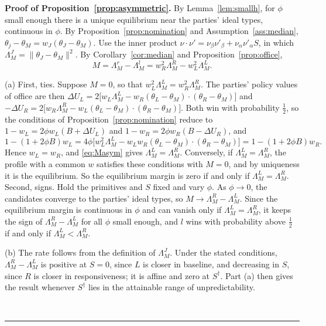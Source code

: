 \documentclass[12pt,letterpaper]{article}
\newenvironment{proof}[1][Proof]{\noindent\textbf{#1.} }{\ \rule{0.5em}{0.5em}}
\begin{document}
\begin{proof}[Proof of Proposition~\ref{prop:asymmetric}]
By Lemma~\ref{lem:smallh}, for $\phi$ small enough there is a unique equilibrium near the parties' ideal types, continuous in $\phi$. By Proposition~\ref{prop:nomination} and Assumption~\ref{ass:median}, $\theta_j-\theta_M=w_J(\theta_J-\theta_M)$. Use the inner product $\nu\cdot\nu'=\nu_\beta\nu'_\beta+\nu_\alpha\nu'_\alpha S$, in which $\Lambda_M^J=\|\theta_J-\theta_M\|^2$. By Corollary~\ref{cor:median} and Proposition~\ref{prop:office},
\begin{equation}\label{eq:Masym}
M=\Lambda_M^r-\Lambda_M^l=w_R^2\Lambda_M^R-w_L^2\Lambda_M^L.
\end{equation}

(a) First, ties. Suppose $M=0$, so that $w_L^2\Lambda_M^L=w_R^2\Lambda_M^R$. The parties' policy values of office are then $\Delta U_L=2\big[w_L\Lambda_M^L-w_R(\theta_L-\theta_M)\cdot(\theta_R-\theta_M)\big]$ and $-\Delta U_R=2\big[w_R\Lambda_M^R-w_L(\theta_L-\theta_M)\cdot(\theta_R-\theta_M)\big]$. Both win with probability $\tfrac12$, so the conditions of Proposition~\ref{prop:nomination} reduce to $1-w_L=2\phi w_L(B+\Delta U_L)$ and $1-w_R=2\phi w_R(B-\Delta U_R)$, and
\[
1-(1+2\phi B)w_L=4\phi\big[w_L^2\Lambda_M^L-w_Lw_R(\theta_L-\theta_M)\cdot(\theta_R-\theta_M)\big]=1-(1+2\phi B)w_R .
\]
Hence $w_L=w_R$, and \eqref{eq:Masym} gives $\Lambda_M^L=\Lambda_M^R$. Conversely, if $\Lambda_M^L=\Lambda_M^R$, the profile with a common $w$ satisfies these conditions with $M=0$, and by uniqueness it is the equilibrium. So the equilibrium margin is zero if and only if $\Lambda_M^L=\Lambda_M^R$. Second, signs. Hold the primitives and $S$ fixed and vary $\phi$. As $\phi\to0$, the candidates converge to the parties' ideal types, so $M\to\Lambda_M^R-\Lambda_M^L$. Since the equilibrium margin is continuous in $\phi$ and can vanish only if $\Lambda_M^L=\Lambda_M^R$, it keeps the sign of $\Lambda_M^R-\Lambda_M^L$ for all $\phi$ small enough, and $l$ wins with probability above $\tfrac12$ if and only if $\Lambda_M^L<\Lambda_M^R$.

(b) The rate follows from the definition of $\Lambda_M^J$. Under the stated conditions, $\Lambda_M^R-\Lambda_M^L$ is positive at $S=0$, since $L$ is closer in baseline, and decreasing in $S$, since $R$ is closer in responsiveness; it is affine and zero at $S^\dagger$. Part (a) then gives the result whenever $S^\dagger$ lies in the attainable range of unpredictability.


\end{proof}
\end{document}
